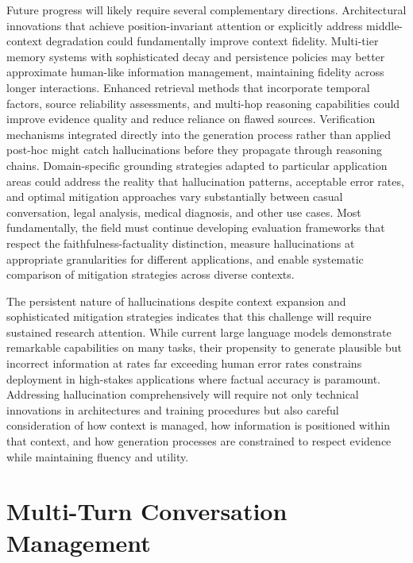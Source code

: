 Future progress will likely require several complementary directions. Architectural innovations that achieve position-invariant attention or explicitly address middle-context degradation could fundamentally improve context fidelity. Multi-tier memory systems with sophisticated decay and persistence policies may better approximate human-like information management, maintaining fidelity across longer interactions. Enhanced retrieval methods that incorporate temporal factors, source reliability assessments, and multi-hop reasoning capabilities could improve evidence quality and reduce reliance on flawed sources. Verification mechanisms integrated directly into the generation process rather than applied post-hoc might catch hallucinations before they propagate through reasoning chains. Domain-specific grounding strategies adapted to particular application areas could address the reality that hallucination patterns, acceptable error rates, and optimal mitigation approaches vary substantially between casual conversation, legal analysis, medical diagnosis, and other use cases. Most fundamentally, the field must continue developing evaluation frameworks that respect the faithfulness-factuality distinction, measure hallucinations at appropriate granularities for different applications, and enable systematic comparison of mitigation strategies across diverse contexts.

The persistent nature of hallucinations despite context expansion and sophisticated mitigation strategies indicates that this challenge will require sustained research attention. While current large language models demonstrate remarkable capabilities on many tasks, their propensity to generate plausible but incorrect information at rates far exceeding human error rates constrains deployment in high-stakes applications where factual accuracy is paramount. Addressing hallucination comprehensively will require not only technical innovations in architectures and training procedures but also careful consideration of how context is managed, how information is positioned within that context, and how generation processes are constrained to respect evidence while maintaining fluency and utility.
\section{Multi-Turn Conversation Management}
\label{sec:multiturn}

